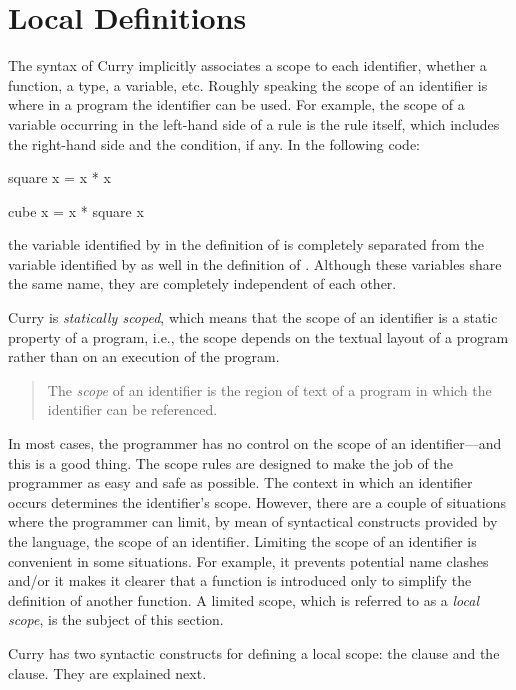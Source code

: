 \section{Local Definitions}
\label{sec:localdefinitions}

The syntax of Curry implicitly associates a scope
to each identifier, whether a function, a type, a variable, etc.
Roughly speaking the scope of an identifier is where in a program
the identifier can be used.
For example, the scope of a variable occurring in the left-hand side
of a rule is the rule itself, which includes the right-hand side
and the condition, if any.
In the following code:
%
\begin{curry}
square x = x * x

cube   x = x * square x
\end{curry}
%
the variable identified by  in the definition of 
is completely separated from the variable 
identified by  as well in the definition of .
Although these variables share the same name, they
are completely independent of each other.

Curry is \emph{statically scoped},
which means that the scope of an
identifier is a static property of a program, i.e.,
the scope depends on the textual layout of a program rather than on
an execution of the program.
%
\begin{quote}
The \emph{scope} of an identifier is the region of text
of a program in which the identifier can be referenced.
\end{quote}
%
In most cases, the programmer has no control on the scope of
an identifier---and this is a good thing.
The scope rules are designed to make the job of the programmer
as easy and safe as possible.
The context in which an identifier occurs determines the
identifier's scope.
However, there are a couple of situations where the programmer
can limit, by mean of syntactical constructs provided by the language,
the scope of an identifier.
Limiting the scope of an identifier is convenient in some situations.
For example, it prevents potential name clashes
and/or it makes it clearer that a function is
introduced only to simplify the definition of another function.
A limited scope,
which is referred to as a \emph{local scope},
is the subject of this section.

Curry has two syntactic constructs 
for defining a local scope: the  clause
and the  clause.
They are explained next.

